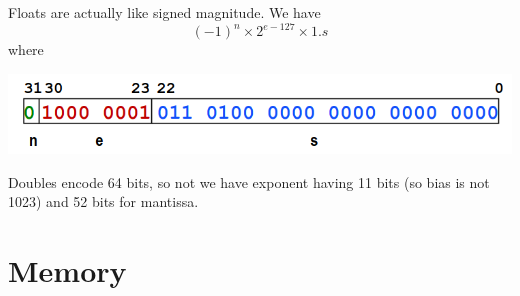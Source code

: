 \documentclass{article}
\begin{document}
  \begin{theorem}
    Floats are actually like signed magnitude. We have 
    \begin{equation} 
      (-1)^n \times 2^{e - 127} \times 1.s
    \end{equation}
    where 
    \begin{center} 
      \includegraphics[scale=0.5]{img/float_encoding.png}
    \end{center}
    Doubles encode 64 bits, so not we have exponent having 11 bits (so bias is not 1023) and 52 bits for mantissa. 
  \end{theorem}

\section{Memory} 
\end{document}
